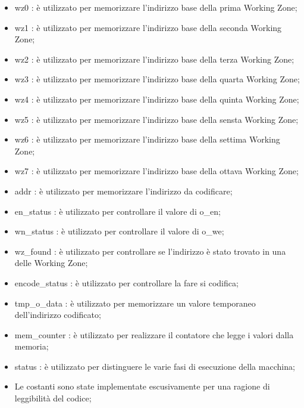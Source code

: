 \documentclass{article}
\begin{document}
\begin{itemize}
\item {\selectfont wz0} : è utilizzato per memorizzare l'indirizzo base della prima Working Zone;
\item {\selectfont wz1} : è utilizzato per memorizzare l'indirizzo base della seconda Working Zone;
\item {\selectfont wz2} : è utilizzato per memorizzare l'indirizzo base della terza Working Zone;
\item {\selectfont wz3} : è utilizzato per memorizzare l'indirizzo base della quarta Working Zone;
\item {\selectfont wz4} : è utilizzato per memorizzare l'indirizzo base della quinta Working Zone;
\item {\selectfont wz5} : è utilizzato per memorizzare l'indirizzo base della sensta Working Zone;
\item {\selectfont wz6} : è utilizzato per memorizzare l'indirizzo base della settima Working Zone;
\item {\selectfont wz7} : è utilizzato per memorizzare l'indirizzo base della ottava Working Zone;
\item {\selectfont addr} : è utilizzato per memorizzare l'indirizzo da codificare;
\item {\selectfont en\_status} : è utilizzato per controllare il valore di {\selectfont o\_en};
\item {\selectfont wn\_status} : è utilizzato per controllare il valore di {\selectfont o\_we};
\item {\selectfont wz\_found} : è utilizzato per controllare se l'indirizzo è stato trovato in una delle Working Zone;
\item {\selectfont encode\_status} : è utilizzato per controllare la fare si codifica;
\item {\selectfont tmp\_o\_data} : è utilizzato per memorizzare un valore temporaneo dell'indirizzo codificato;
\item {\selectfont mem\_counter} : è utilizzato per realizzare il contatore che legge i valori dalla memoria;
\item {\selectfont status} : è utilizzato per distinguere le varie fasi di esecuzione della macchina;
\item Le costanti sono state implementate escusivamente per una ragione di leggibilità del codice;
\end{itemize}
\end{document}
